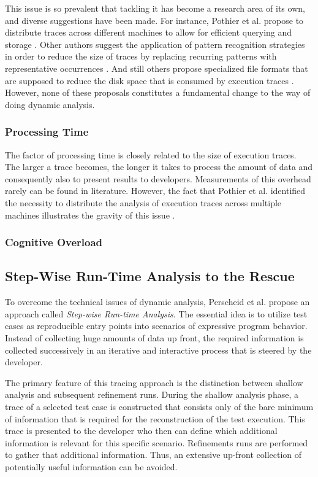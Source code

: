This issue is so prevalent that tackling it has become a research area of its own, and diverse suggestions have been made.
For instance, Pothier et al. propose to distribute traces across different machines to allow for efficient querying and storage \cite{pothier_scalable_2007}.
Other authors suggest the application of pattern recognition strategies in order to reduce the size of traces by replacing recurring patterns with representative occurrences .
And still others propose specialized file formats that are supposed to reduce the disk space that is consumed by execution traces .
However, none of these proposals constitutes a fundamental change to the way of doing dynamic analysis.

\subsubsection{Processing Time}
The factor of processing time is closely related to the size of execution traces.
The larger a trace becomes, the longer it takes to process the amount of data and consequently also to present results to developers.
Measurements of this overhead rarely can be found in literature.
However, the fact that Pothier et al. identified the necessity to distribute the analysis of execution traces across multiple machines illustrates the gravity of this issue \cite{pothier_scalable_2007}.

\subsubsection{Cognitive Overload}

\subsection{Step-Wise Run-Time Analysis to the Rescue}
\label{ss:BackgroundTracing}
To overcome the technical issues of dynamic analysis, Perscheid et al. propose an approach called \emph{Step-wise Run-time Analysis}.
The essential idea is to utilize test cases as reproducible entry points into scenarios of expressive program behavior.
Instead of collecting huge amounts of data up front, the required information is collected successively in an iterative and interactive process that is steered by the developer.

The primary feature of this tracing approach is the distinction between shallow analysis and subsequent refinement runs.
During the shallow analysis phase, a trace of a selected test case is constructed that consists only of the bare minimum of information that is required for the reconstruction of the test execution.
This trace is presented to the developer who then can define which additional information is relevant for this specific scenario.
Refinements runs are performed to gather that additional information.
Thus, an extensive up-front collection of potentially useful information can be avoided.

